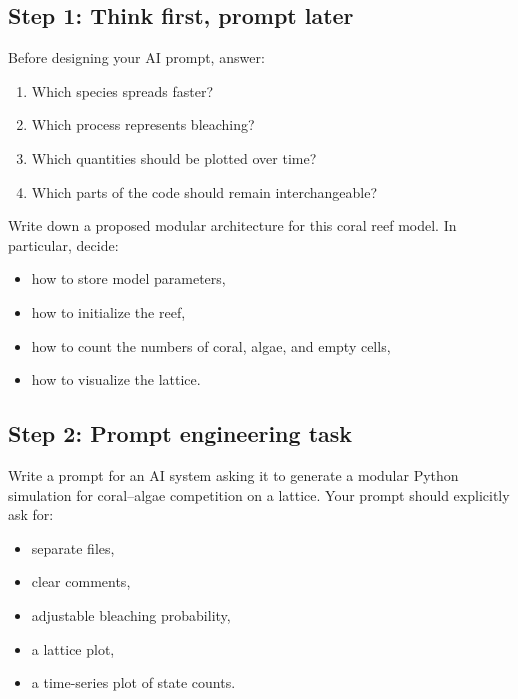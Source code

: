 \documentclass[paper=letter, fontsize=12pt]{article}
\numberwithin{equation}{section}
\begin{document}
\subsection*{Step 1: Think first, prompt later}

\begin{taskbox}
Before designing your AI prompt, answer:
\begin{enumerate}[label=\arabic*.]
\item Which species spreads faster?
\item Which process represents bleaching?
\item Which quantities should be plotted over time?
\item Which parts of the code should remain interchangeable?
\end{enumerate}
\end{taskbox}

\begin{taskbox}
Write down a proposed modular architecture for this coral reef model. In particular, decide:
\begin{itemize}
\item how to store model parameters,
\item how to initialize the reef,
\item how to count the numbers of coral, algae, and empty cells,
\item how to visualize the lattice.
\end{itemize}
\end{taskbox}

\subsection*{Step 2: Prompt engineering task}

\begin{aibox}
Write a prompt for an AI system asking it to generate a modular Python simulation for coral--algae competition on a lattice. Your prompt should explicitly ask for:
\begin{itemize}
\item separate files,
\item clear comments,
\item adjustable bleaching probability,
\item a lattice plot,
\item a time-series plot of state counts.
\end{itemize}
\end{aibox}
\end{document}
